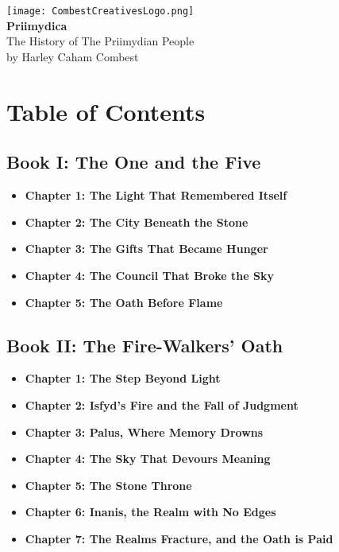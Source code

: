 \documentclass[9pt]{article}
\begin{document}
\section*{}

\begin{center}
    \vspace{1in}
    \texttt{[image: CombestCreativesLogo.png]}\\
    \vspace{1in}
    \Huge \textbf{Priimydica} \\
    \vspace{.5in}
    \huge The History of The Priimydian People \\
    \vspace{.5in}
    \LARGE by Harley Caham Combest \\
\end{center}

\newpage

\section*{Table of Contents}

\subsection*{Book I: The One and the Five}
\begin{itemize}
  \item \textbf{Chapter 1: The Light That Remembered Itself}
  \item \textbf{Chapter 2: The City Beneath the Stone}
  \item \textbf{Chapter 3: The Gifts That Became Hunger}
  \item \textbf{Chapter 4: The Council That Broke the Sky}
  \item \textbf{Chapter 5: The Oath Before Flame}
\end{itemize}

\subsection*{Book II: The Fire-Walkers’ Oath}
\begin{itemize}
  \item \textbf{Chapter 1: The Step Beyond Light}
  \item \textbf{Chapter 2: Isfyd’s Fire and the Fall of Judgment}
  \item \textbf{Chapter 3: Palus, Where Memory Drowns}
  \item \textbf{Chapter 4: The Sky That Devours Meaning}
  \item \textbf{Chapter 5: The Stone Throne}
  \item \textbf{Chapter 6: Inanis, the Realm with No Edges}
  \item \textbf{Chapter 7: The Realms Fracture, and the Oath is Paid}
\end{itemize}
\end{document}

